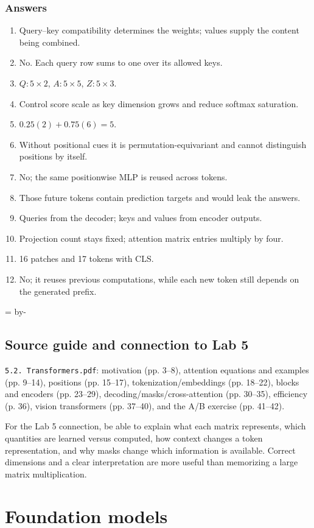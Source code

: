 \documentclass[11pt]{article}
\newcommand{\newsubsection}[1]{\par\begingroup\skip0=\pagegoal\advance\skip0 by-\pagetotal\ifdim\skip0<12\baselineskip\newpage\fi\endgroup\subsection{#1}}
\begin{document}
\subsubsection{Answers}
\begin{enumerate}
\item Query--key compatibility determines the weights; values supply the content being combined.
\item No. Each query row sums to one over its allowed keys.
\item $Q:5\times2$, $A:5\times5$, $Z:5\times3$.
\item Control score scale as key dimension grows and reduce softmax saturation.
\item $0.25(2)+0.75(6)=5$.
\item Without positional cues it is permutation-equivariant and cannot distinguish positions by itself.
\item No; the same positionwise MLP is reused across tokens.
\item Those future tokens contain prediction targets and would leak the answers.
\item Queries from the decoder; keys and values from encoder outputs.
\item Projection count stays fixed; attention matrix entries multiply by four.
\item 16 patches and 17 tokens with CLS.
\item No; it reuses previous computations, while each new token still depends on the generated prefix.
\end{enumerate}

\newsubsection{Source guide and connection to Lab 5}
\texttt{5.2. Transformers.pdf}: motivation (pp. 3--8), attention equations and examples (pp. 9--14), positions (pp. 15--17), tokenization/embeddings (pp. 18--22), blocks and encoders (pp. 23--29), decoding/masks/cross-attention (pp. 30--35), efficiency (p. 36), vision transformers (pp. 37--40), and the A/B exercise (pp. 41--42).

For the Lab 5 connection, be able to explain what each matrix represents, which quantities are learned versus computed, how context changes a token representation, and why masks change which information is available. Correct dimensions and a clear interpretation are more useful than memorizing a large matrix multiplication.


\clearpage
\section{Foundation models}
\end{document}

